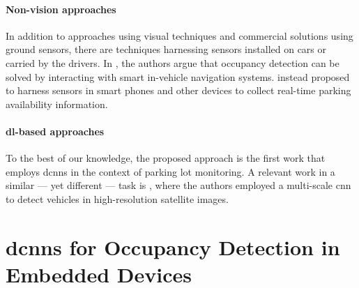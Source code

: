 \paragraph{Non-vision approaches}
In addition to approaches using visual techniques and commercial solutions using ground sensors, there are techniques harnessing sensors installed on cars or carried by the drivers.
In \cite{caicedo2012prediction}, the authors argue that occupancy detection can be solved by interacting with smart in-vehicle navigation systems.
\citet{lan2014intelligent} instead proposed to harness sensors in smart phones and other devices to collect real-time parking availability information.
%
\paragraph{\gls{dl}-based approaches}
To the best of our knowledge, the proposed approach is the first work that employs \glspl{dcnn} in the context of parking lot monitoring.
A relevant work in a similar --- yet different --- task is \cite{chen2014vehicle}, where the authors employed a multi-scale \gls{cnn} to detect vehicles in high-resolution satellite images.

\section{\glspl{dcnn} for Occupancy Detection in Embedded Devices}
\label{sec:mini:occupancy-detection}

